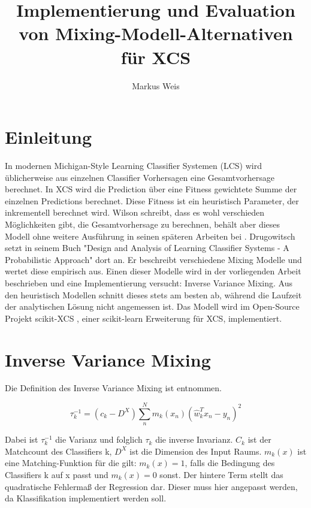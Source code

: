 \documentclass{ocsmnar}
\begin{document}
\title{Implementierung und Evaluation von Mixing-Modell-Alternativen für XCS}


\author{Markus Weis}

\maketitle




\section{Einleitung}
In modernen Michigan-Style Learning Classifier Systemen (LCS) wird üblicherweise aus einzelnen Classifier Vorhersagen eine Gesamtvorhersage berechnet. In XCS wird die Prediction über eine Fitness gewichtete Summe der einzelnen Predictions berechnet. Diese Fitness ist ein heuristisch Parameter, der inkrementell berechnet wird. Wilson schreibt, dass es wohl verschieden Möglichkeiten gibt, die Gesamtvorhersage zu berechnen, behält aber dieses Modell ohne weitere Ausführung in seinen späteren Arbeiten bei \cite{Wilson95}. 
Drugowitsch setzt in seinem Buch "Design and Analysis of Learning Classifier Systems - A Probabilistic Approach" \cite{book} dort an. Er beschreibt verschiedene Mixing Modelle und wertet diese empirisch aus. 
Einen dieser Modelle wird in der vorliegenden Arbeit beschrieben und eine Implementierung versucht: Inverse Variance Mixing. Aus den heuristisch Modellen schnitt dieses stets am besten ab, während die Laufzeit der  analytischen Lösung nicht angemessen ist. Das Modell wird im Open-Source Projekt scikit-XCS \cite{repo}, einer scikit-learn Erweiterung für XCS, implementiert. 

\section{Inverse Variance Mixing}
Die Definition des Inverse Variance Mixing ist \cite{book} entnommen. 

$$ \tau_{k}^{-1} = (c_{k} - D^{X}) \sum_{n}^{N} m_{k}(x_{n}) (\hat{w}_{k}^T x_{n} - y_{n})^{2}$$

Dabei ist $\tau_{k}^{-1}$ die Varianz und folglich $\tau_{k}$ die inverse Invarianz. $C_{k}$ ist der Matchcount des Classifiers k, $D^{X}$ ist die Dimension des Input Raums. $m_{k}(x)$ ist eine Matching-Funktion für die gilt: $m_{k}(x) = 1$, falls die Bedingung des Classifiers k auf x passt und $m_{k}(x) = 0$ sonst. 
Der hintere Term stellt das quadratische Fehlermaß der Regression dar. Dieser muss hier angepasst  werden, da Klassifikation implementiert werden soll.
\end{document}
